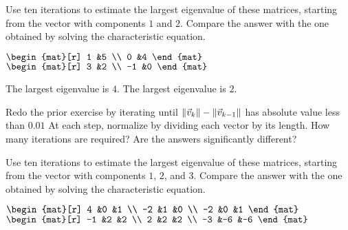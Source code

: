 \begin{exercises}
  \item 
    Use ten iterations to estimate the largest eigenvalue of these
    matrices, starting from the vector with components $1$ and $2$.
    Compare the answer with the one obtained by solving the characteristic
    equation.
    \begin{exparts*}
      \partsitem $\begin{mat}[r]
                    1  &5  \\
                    0  &4
                  \end{mat}$
      \partsitem $\begin{mat}[r]
                    3   &2  \\
                    -1  &0
                  \end{mat}$
    \end{exparts*}
    \begin{answer}
     \begin{exparts}
       \partsitem The largest eigenvalue is $4$.
       \partsitem The largest eigenvalue is $2$.
     \end{exparts}
    \end{answer}
  \item 
     Redo the prior exercise by iterating until 
     $\|\vec{v}_k\|-\|\vec{v}_{k-1}\|$ has absolute value less than
     $0.01$
     At each step, normalize by dividing each vector by its length.
     How many iterations are required?
     Are the answers significantly different?
  \item 
    Use ten iterations to estimate the largest eigenvalue of these
    matrices, starting from the vector with components $1$, $2$, and $3$.
    Compare the answer with the one obtained by solving the characteristic
    equation.
    \begin{exparts*}
      \partsitem $\begin{mat}[r]
                    4   &0  &1 \\
                    -2  &1  &0  \\
                    -2  &0  &1
                  \end{mat}$
      \partsitem $\begin{mat}[r]
                   -1  &2  &2  \\
                    2  &2  &2  \\
                   -3  &-6 &-6
                  \end{mat}$
    \end{exparts*}

\end{exercises}
